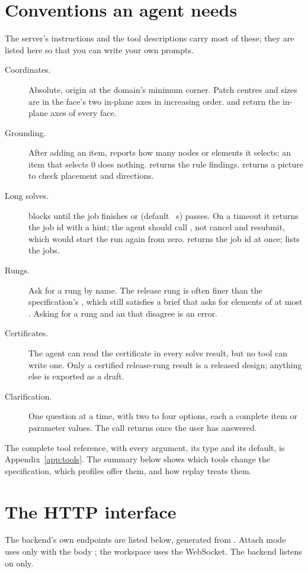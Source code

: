 \section{Conventions an agent needs}\label{sec:agentconventions}
The server's instructions and the tool descriptions carry most of these; they are listed here so that you can write
your own prompts.

\begin{description}
  \item[Coordinates.] Absolute, origin at the domain's minimum corner. Patch centres and sizes are in the face's two
  in-plane axes in increasing order.  and  return the in-plane axes of every face.
  \item[Grounding.] After adding an item,  reports how many nodes or elements it selects; an item that
  selects 0 does nothing.  returns the rule findings.  returns a picture to check
  placement and directions.
  \item[Long solves.]  blocks until the job finishes or  (default \SolveTimeout~s) passes.
  On a timeout it returns the job id with a hint; the agent should call , not cancel and resubmit, which
  would start the run again from zero.  returns the job id at once;  lists the jobs.
  \item[Rungs.] Ask for a rung by name. The release rung is often finer than the specification's , which still
  satisfies a brief that asks for elements of at most . Asking for a rung and an  that disagree is an
  error.
  \item[Certificates.] The agent can read the certificate in every solve result, but no tool can write one. Only a
  certified release-rung result is a released design; anything else is exported as a draft.
  \item[Clarification.] One question at a time, with two to four options, each a complete item or parameter values.
  The call returns once the user has answered.
\end{description}

The complete tool reference, with every argument, its type and its default, is Appendix~\ref{app:tools}. The summary
below shows which tools change the specification, which profiles offer them, and how replay treats them.



\section{The HTTP interface}\label{sec:http}
The backend's own endpoints are listed below, generated from . Attach mode uses only
 with the body ; the workspace uses the
WebSocket. The backend listens on  only.


